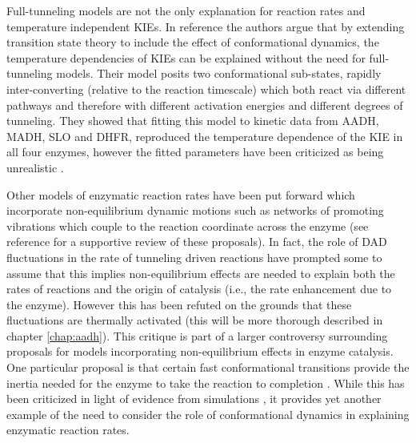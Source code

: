 Full-tunneling models are not the only explanation for reaction rates and temperature independent KIEs. In reference \cite{glowackiProteinDynamicsEnzyme2012, glowackiTakingOckhamRazor2012b} the authors argue that by extending transition state theory to include the effect of conformational dynamics, the temperature dependencies of KIEs can be explained without the need for full-tunneling models. Their model posits two conformational sub-states, rapidly inter-converting (relative to the reaction timescale) which both react  via different pathways and therefore with different activation energies and different degrees of tunneling. They showed that fitting this model to kinetic data from AADH, MADH, SLO and DHFR, reproduced the temperature dependence of the KIE in all four enzymes, however the fitted parameters have been criticized as being unrealistic \cite{klinmanHydrogenTunnelingLinks2013}. 

Other models of enzymatic reaction rates have been put forward which incorporate non-equilibrium dynamic motions such as networks of promoting vibrations which couple to the reaction coordinate across the enzyme  (see reference \cite{antoniouProteinDynamicsEnzymatic2011} for a supportive review of these proposals). In fact, the role of DAD fluctuations in the rate of tunneling driven reactions have prompted some \cite{adamczykCatalysisDihydrofolateReductase2011, pisliakovEnzymeMillisecondConformational2009} to assume that this implies non-equilibrium effects are needed to explain both the rates of reactions and the origin of catalysis (i.e., the rate enhancement due to the enzyme). However this has been refuted \cite{klinmanHydrogenTunnelingLinks2013} on the grounds that these fluctuations are thermally activated (this will be more thorough described  in chapter \ref{chap:aadh}). This critique is part of a larger controversy  \cite{klinmanHydrogenTunnelingLinks2013, puMultidimensionalTunnelingRecrossing2006, mcgeaghProteinDynamicsEnzyme2011,glowackiTakingOckhamRazor2012b,glowackiProteinDynamicsEnzyme2012} surrounding proposals for models incorporating non-equilibrium effects in enzyme catalysis. One particular proposal is that certain fast conformational transitions provide the inertia needed for the enzyme to take the reaction to completion \cite{eisenmesserIntrinsicDynamicsEnzyme2005, henzler-wildmanIntrinsicMotionsEnzymatic2007, olssonSoluteSolventDynamics2004}. While this has been criticized in light of evidence from simulations \cite{kamerlinMultiscaleModelingBiological2011}, it provides yet another example of the need to consider the role of conformational dynamics in explaining enzymatic reaction rates.  


